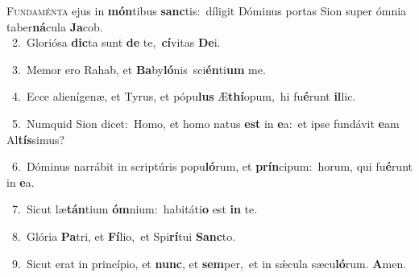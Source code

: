 \lettrine{\initial\textcolor{\initialcolor}{F}}{undaménta} ejus in \textbf{món}\-tibus \textbf{sanc}\-tis:~\star díligit Dóminus portas Sion super ómnia taber\-\textbf{ná}\-cula \textbf{Ja}\-cob.\\
{\numbfont\textcolor{\numbcolor}{~2.}}~Gloriósa \textbf{dic}\-ta sunt \textbf{de} te,~\star \textbf{cí}\-vitas \textbf{De}\-i.\par
{\numbfont\textcolor{\numbcolor}{~3.}}~Memor ero Rahab, et \textbf{Ba}\-by\-\textbf{ló}\-nis~\star sci\-\textbf{én}\-ti\textbf{um} me.\par
{\numbfont\textcolor{\numbcolor}{~4.}}~Ecce alienígenæ, et Tyrus, et pópu\textbf{lus} Æ\-\textbf{thí}\-opum,~\star hi fu\-\textbf{é}\-runt \textbf{il}\-lic.\par
{\numbfont\textcolor{\numbcolor}{~5.}}~Numquid Sion dicet:~\dagger Homo, et homo natus \textbf{est} in \textbf{e}\-a:~\star et ipse fundávit \textbf{e}\-am Al\-\textbf{tís}\-simus?\par
{\numbfont\textcolor{\numbcolor}{~6.}}~Dóminus narrábit in scriptúris popu\-\textbf{ló}\-rum, et \textbf{prín}\-cipum:~\star horum, qui fu\-\textbf{é}\-runt in \textbf{e}\-a.\par
{\numbfont\textcolor{\numbcolor}{~7.}}~Sicut læ\-\textbf{tán}\-tium \textbf{óm}\-nium:~\star habitáti\textbf{o} est \textbf{in} te.\par
{\numbfont\textcolor{\numbcolor}{~8.}}~Glória \textbf{Pa}\-tri, et \textbf{Fí}\-lio,~\star et Spi\-\textbf{rí}\-tui \textbf{Sanc}\-to.\par
{\numbfont\textcolor{\numbcolor}{~9.}}~Sicut erat in princípio, et \textbf{nunc}\-, et \textbf{sem}\-per,~\star et in sǽcula sæcu\-\textbf{ló}\-rum. \textbf{A}\-men.\par
